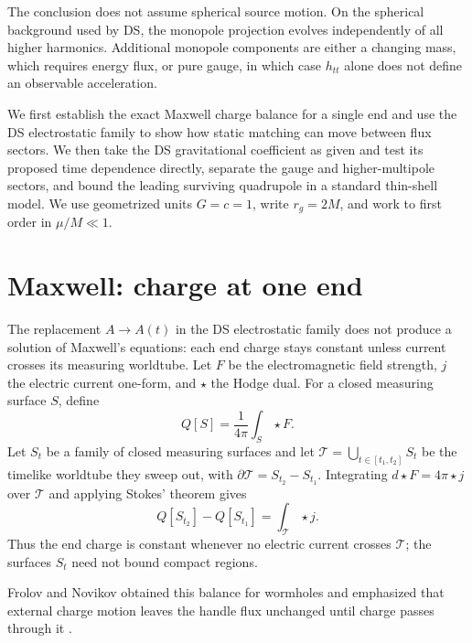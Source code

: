 \documentclass[aps,prd,10pt,onecolumn,nofootinbib,superscriptaddress,floatfix]{revtex4-2}
\begin{document}
The conclusion does not assume spherical source motion.  On the spherical
background used by DS, the monopole projection evolves independently of all
higher harmonics.  Additional monopole components are either a changing mass,
which requires energy flux, or pure gauge, in which case $h_{tt}$ alone does
not define an observable acceleration.

We first establish the exact Maxwell charge balance for a single end and use
the DS electrostatic family to show how static matching can move between flux
sectors.
We then take the DS gravitational coefficient as given and test its proposed
time dependence directly, separate the gauge and higher-multipole sectors, and
bound the leading surviving quadrupole in a standard thin-shell model.
We use geometrized units $G=c=1$, write $r_g=2M$, and work to first order in
$\mu/M\ll1$.

\section{Maxwell: charge at one end}
\label{sec:maxwell}

The replacement $A\to A(t)$ in the DS electrostatic family does not produce a
solution of Maxwell's equations: each end charge stays constant unless current
crosses its measuring worldtube.
Let $F$ be the electromagnetic field strength, $j$ the electric current
one-form, and $\star$ the Hodge dual.
For a closed measuring surface $S$, define
\begin{equation}
  Q[S]=\frac{1}{4\pi}\int_S\star F.
  \label{eq:maxwell-charge}
\end{equation}
Let $S_t$ be a family of closed measuring surfaces and let
$\mathcal T=\bigcup_{t\in[t_1,t_2]}S_t$ be the timelike worldtube they sweep
out, with $\partial\mathcal T=S_{t_2}-S_{t_1}$.  Integrating
$d\star F=4\pi\star j$ over $\mathcal T$ and applying Stokes' theorem gives
\begin{equation}
  Q[S_{t_2}]-Q[S_{t_1}]=\int_{\mathcal T}\star j.
  \label{eq:maxwell-balance}
\end{equation}
Thus the end charge is constant whenever no electric current crosses
$\mathcal T$; the surfaces $S_t$ need not bound compact regions.

Frolov and Novikov obtained this balance for wormholes and emphasized that
external charge motion leaves the handle flux unchanged until charge passes
through it \cite{FrolovNovikov1990PhysicalEffects}.
\end{document}
